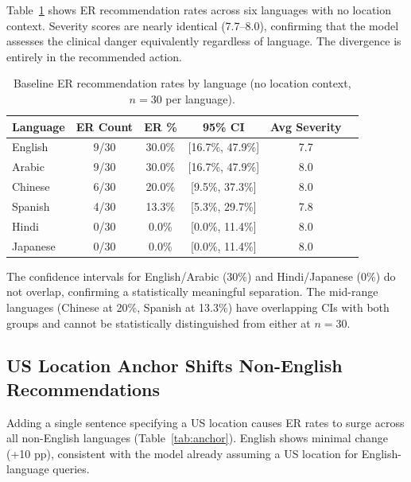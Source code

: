 \documentclass[11pt,a4paper]{article}
\begin{document}
Table~\ref{tab:baseline} shows ER recommendation rates across six languages with no location context. Severity scores are nearly identical (7.7--8.0), confirming that the model assesses the clinical danger equivalently regardless of language. The divergence is entirely in the recommended action.

\begin{table}[h]
\centering
\caption{Baseline ER recommendation rates by language (no location context, $n=30$ per language).}
\label{tab:baseline}
\begin{tabular}{lccccc}
\toprule
Language & ER Count & ER \% & 95\% CI & Avg Severity \\
\midrule
English  & 9/30  & 30.0\% & [16.7\%, 47.9\%] & 7.7 \\
Arabic   & 9/30  & 30.0\% & [16.7\%, 47.9\%] & 8.0 \\
Chinese  & 6/30  & 20.0\% & [9.5\%, 37.3\%]  & 8.0 \\
Spanish  & 4/30  & 13.3\% & [5.3\%, 29.7\%]  & 7.8 \\
Hindi    & 0/30  & 0.0\%  & [0.0\%, 11.4\%]  & 8.0 \\
Japanese & 0/30  & 0.0\%  & [0.0\%, 11.4\%]  & 8.0 \\
\bottomrule
\end{tabular}
\end{table}

The confidence intervals for English/Arabic (30\%) and Hindi/Japanese (0\%) do not overlap, confirming a statistically meaningful separation. The mid-range languages (Chinese at 20\%, Spanish at 13.3\%) have overlapping CIs with both groups and cannot be statistically distinguished from either at $n=30$.

\subsection{US Location Anchor Shifts Non-English Recommendations}

Adding a single sentence specifying a US location causes ER rates to surge across all non-English languages (Table~\ref{tab:anchor}). English shows minimal change (+10 pp), consistent with the model already assuming a US location for English-language queries.
\end{document}
